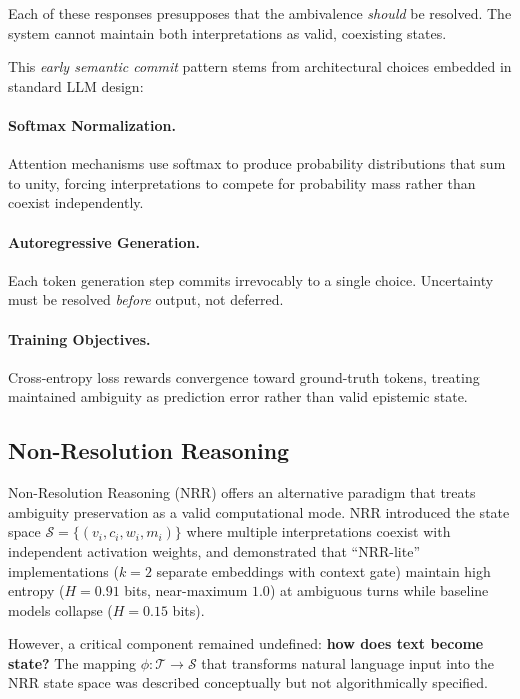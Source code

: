 \documentclass[11pt,a4paper]{article}
\begin{document}
Each of these responses presupposes that the ambivalence \textit{should} be resolved. 
The system cannot maintain both interpretations as valid, coexisting states.

This \textit{early semantic commit} pattern stems from architectural choices embedded 
in standard LLM design:

\paragraph{Softmax Normalization.}
Attention mechanisms use softmax to produce probability distributions that sum to unity, 
forcing interpretations to compete for probability mass rather than coexist independently.

\paragraph{Autoregressive Generation.}
Each token generation step commits irrevocably to a single choice. Uncertainty must be 
resolved \textit{before} output, not deferred.

\paragraph{Training Objectives.}
Cross-entropy loss rewards convergence toward ground-truth tokens, treating maintained 
ambiguity as prediction error rather than valid epistemic state.

\subsection{Non-Resolution Reasoning}

Non-Resolution Reasoning (NRR) \cite{saito2025nrr} offers an alternative paradigm that 
treats ambiguity preservation as a valid computational mode. NRR introduced the state 
space $\mathcal{S} = \{(v_i, c_i, w_i, m_i)\}$ where multiple interpretations coexist with 
independent activation weights, and demonstrated that ``NRR-lite'' 
implementations ($k{=}2$ separate embeddings with context gate) maintain high entropy 
($H = 0.91$ bits, near-maximum $1.0$) at ambiguous turns while baseline 
models collapse ($H = 0.15$ bits).

However, a critical component remained undefined: \textbf{how does text become state?} 
The mapping $\phi: \mathcal{T} \to \mathcal{S}$ that transforms natural language input 
into the NRR state space was described conceptually but not algorithmically specified.
\end{document}
